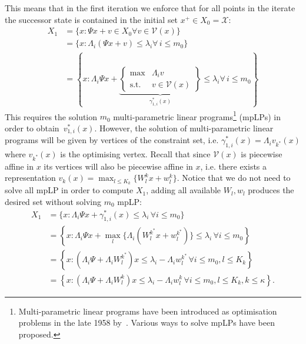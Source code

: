 %
This means that in the first iteration we enforce that for all points in the iterate the 
successor state is contained in the initial set $x^+\in X_0 = \mathscr X$:
%
\begin{equation}\label{eq:PWA:disturbance:first:iterate}
\begin{split}
	X_1 &= \{x: \Psi x + v\in X_0 \forall v\in\mathcal V(x)\}\\
	&=\{x:\Lambda_i(\Psi x +v)\leq \lambda_i \forall\,i\leq m_0\}\\
	&=\left\{x:\Lambda_i\Psi x + 
	\underbrace{\left\{\begin{array}{rl}\max& \Lambda_i v\\ 
	\text{s.t.}& v\in\mathcal V(x)
	\end{array}\right\}}_{\gamma_{1,i}^\ast(x)} \leq \lambda_i \forall\,i\leq m_0\right\}
\end{split}
\end{equation}
This requires the solution $m_0$ multi-parametric linear programs\footnote{Multi-parametric 
linear programs have been introduced as optimisation problems
in the late 1958 by~\cite{Courtillot:1958}. Various ways to solve mpLPs have been proposed.}
(mpLPs) in order to obtain~$v_{1,i}^\ast(x)$.
%
However, the solution of multi-parametric linear programs will be given by vertices 
of the constraint set, i.e. $\gamma_{1,i}^\ast(x)=\Lambda_i v_{k^\ast}(x)$ where $v_{k^\ast}(x)$
is the optimising vertex.
%
Recall that since $\mathcal V(x)$ is piecewise affine in $x$ its vertices will also be piecewise 
affine in $x$, i.e. there exists a representation $v_k(x)=\max_{l\leq K_k}\{W_l^k x + w_l^k\}$.
%
Notice that we do not need to solve all mpLP in order to compute $X_1$, adding all available
$W_l,w_l$ produces the desired set without solving $m_0$ mpLP:
%
\begin{equation}\label{eq:derivation:of:row:reduction:instead:of:mpLP}
\begin{split}
	X_1 &= \{x: \Lambda_i\Psi x + \gamma_{1,i}^\ast(x)\leq\lambda_i \,\forall i\leq m_0 \}\\
	&= \left\{x: \Lambda_i\Psi x + \max_l\{\Lambda_i (W_l^{k^\ast} x + w_l^{k^\ast}) \} \leq \lambda_i\, 
	\forall i\leq m_0 \right\} \\
	&= \left\{x: (\Lambda_i\Psi + \Lambda_i W_l^{k^\ast}) x \leq \lambda_i-\Lambda_i w_l^{k^\ast}\,
	\forall i\leq m_0, l\leq K_k  \right\} \\
	&= \left\{x: (\Lambda_i\Psi + \Lambda_i W_l^k) x \leq \lambda_i - \Lambda_i w_l^k\,
	\forall i\leq m_0, l\leq K_k, k\leq \kappa \right\}.
\end{split}
\end{equation}
